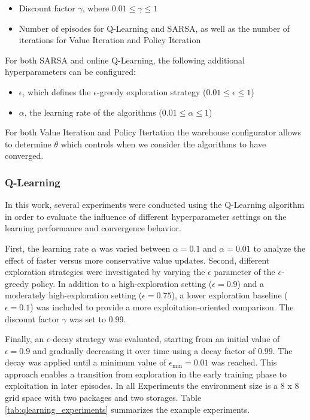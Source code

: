 \documentclass[a4paper,11pt]{article}
\theoremstyle{definition}
\begin{document}
\begin{itemize}
    \item Discount factor $\gamma$, where $0.01 \leq \gamma \leq 1$
    
    \item Number of episodes for Q-Learning and SARSA, as well as the number of iterations for Value Iteration and Policy Iteration
\end{itemize}

For both SARSA and online Q-Learning, the following additional hyperparameters can be configured:

\begin{itemize}
    \item $\epsilon$, which defines the $\epsilon$-greedy exploration strategy ($0.01 \leq \epsilon \leq 1$)
    
    \item $\alpha$, the learning rate of the algorithms ($0.01 \leq \alpha \leq 1$)
\end{itemize}

For both Value Iteration and Policy Itertation the warehouse configurator allows to determine $\theta$ which controls when we consider the algorithms to have converged.

\subsubsection{Q-Learning}
In this work, several experiments were conducted using the Q-Learning algorithm in order to evaluate the influence of different hyperparameter settings on the learning performance and convergence behavior.

First, the learning rate $\alpha$ was varied between $\alpha = 0.1$ and $\alpha = 0.01$ to analyze the effect of faster versus more conservative value updates. Second, different exploration strategies were investigated by varying the $\epsilon$ parameter of the $\epsilon$-greedy policy. In addition to a high-exploration setting ($\epsilon = 0.9$) and a moderately high-exploration setting ($\epsilon = 0.75$), a lower exploration baseline ($\epsilon = 0.1$) was included to provide a more exploitation-oriented comparison. The discount factor $\gamma$ was set to 0.99.

Finally, an $\epsilon$-decay strategy was evaluated, starting from an initial value of $\epsilon = 0.9$ and gradually decreasing it over time using a decay factor of $0.99$. The decay was applied until a minimum value of $\epsilon_{\min} = 0.01$ was reached. This approach enables a transition from exploration in the early training phase to exploitation in later episodes. In all Experiments the environment size is a 8 x 8 grid space with two packages and two storages. 
Table \ref{tab:qlearning_experiments} summarizes the example experiments.
\end{document}
